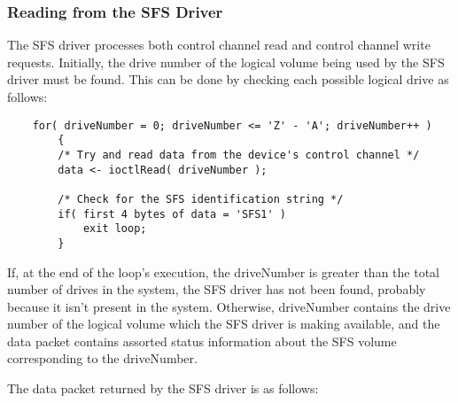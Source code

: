 \subsubsection{Reading from the SFS Driver}

The SFS driver processes both control channel read and control channel write
requests.  Initially, the drive number of the logical volume being used by the
SFS driver must be found.  This can be done by checking each possible logical
drive as follows:

\begin{verbatim}
    for( driveNumber = 0; driveNumber <= 'Z' - 'A'; driveNumber++ )
        {
        /* Try and read data from the device's control channel */
        data <- ioctlRead( driveNumber );

        /* Check for the SFS identification string */
        if( first 4 bytes of data = 'SFS1' )
            exit loop;
        }
\end{verbatim}

If, at the end of the loop's execution, the driveNumber is greater than the
total number of drives in the system, the SFS driver has not been found,
probably because it isn't present in the system.  Otherwise, driveNumber
contains the drive number of the logical volume which the SFS driver is making
available, and the data packet contains assorted status information about the
SFS volume corresponding to the driveNumber.

The data packet returned by the SFS driver is as follows:

